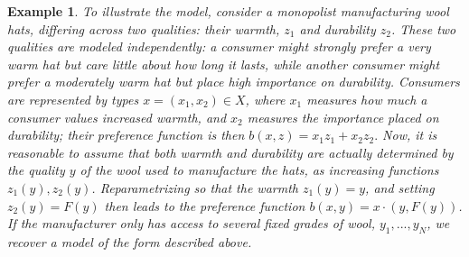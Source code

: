 \documentclass[12pt,reqno]{amsart}
\newtheorem{example}{Example}
\begin{document}
\begin{example}
 To illustrate the model, consider a monopolist manufacturing wool hats, differing across two qualities: their warmth, $z_1$ and durability $z_2$. These two qualities are modeled independently: a consumer might strongly prefer a very warm hat but care little about how long it lasts, while another consumer might prefer a moderately warm hat but place high importance on durability.
Consumers are represented by types $x=(x_1,x_2)\in X$, where $x_1$ measures how much a consumer values increased warmth, and $x_2$ measures the importance placed on durability; their preference function is then $b(x,z) = x_1z_1+x_2z_2.$
Now, it is reasonable to assume that both warmth and durability are actually determined  by the \emph{quality} $y$ of the wool used to manufacture the hats, as increasing functions $z_1(y),z_2(y)$.  Reparametrizing so that the warmth $z_1(y) =y$, and setting $z_2(y)=F(y)$ then leads to the preference function $b(x,y) =x \cdot (y,F(y))$.  If the manufacturer only has access to several fixed grades of wool, $y_1,...,y_N$, we recover a model of the form described above. 
\end{example}
\end{document}
